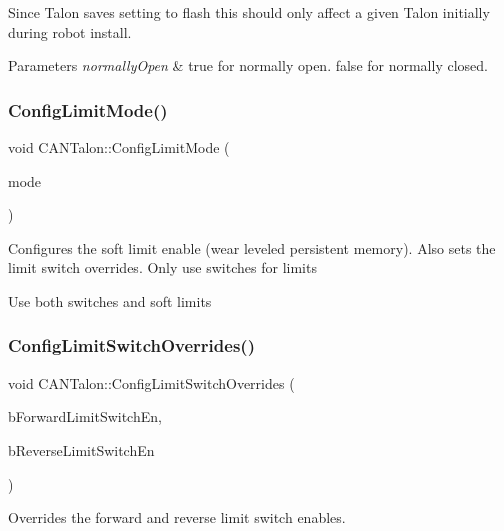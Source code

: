 Since Talon saves setting to flash this should only affect a given Talon initially during robot install.


\begin{DoxyParams}{Parameters}
{\em normally\+Open} & true for normally open. false for normally closed. \\
\hline
\end{DoxyParams}
\mbox{\label{class_c_a_n_talon_a6720f4720939dd590b1db6a33d09aef2}} 
\subsubsection{\texorpdfstring{Config\+Limit\+Mode()}{ConfigLimitMode()}}
{\footnotesize\ttfamily void C\+A\+N\+Talon\+::\+Config\+Limit\+Mode (\begin{DoxyParamCaption}\item[{Limit\+Mode}]{mode }\end{DoxyParamCaption})\hspace{0.3cm}{\ttfamily [override]}}

Configures the soft limit enable (wear leveled persistent memory). Also sets the limit switch overrides. Only use switches for limits

Use both switches and soft limits \mbox{\label{class_c_a_n_talon_a2b70b503b3ea36373884d218be87a5d0}} 
\subsubsection{\texorpdfstring{Config\+Limit\+Switch\+Overrides()}{ConfigLimitSwitchOverrides()}}
{\footnotesize\ttfamily void C\+A\+N\+Talon\+::\+Config\+Limit\+Switch\+Overrides (\begin{DoxyParamCaption}\item[{bool}]{b\+Forward\+Limit\+Switch\+En,  }\item[{bool}]{b\+Reverse\+Limit\+Switch\+En }\end{DoxyParamCaption})}

Overrides the forward and reverse limit switch enables.


